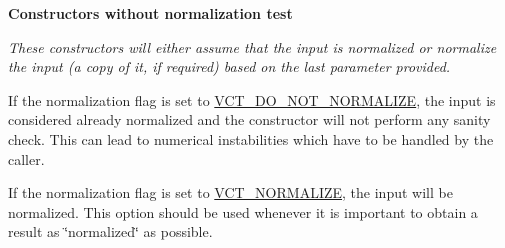 \begin{Indent}{\bf Constructors without normalization test}\par
{\em These constructors will either assume that the input is normalized or normalize the input (a copy of it, if required) based on the last parameter provided.


\begin{DoxyItemize}
\item If the normalization flag is set to \hyperlink{vct_forward_declarations_8h_a6fd516b0c35fa9967b4da5f03a788985}{V\-C\-T\-\_\-\-D\-O\-\_\-\-N\-O\-T\-\_\-\-N\-O\-R\-M\-A\-L\-I\-Z\-E}, the input is considered already normalized and the constructor will not perform any sanity check. This can lead to numerical instabilities which have to be handled by the caller.


\item If the normalization flag is set to \hyperlink{vct_forward_declarations_8h_ae54c682b919a7c5743ea498810518565}{V\-C\-T\-\_\-\-N\-O\-R\-M\-A\-L\-I\-Z\-E}, the input will be normalized. This option should be used whenever it is important to obtain a result as \char`\"{}normalized\char`\"{} as possible.



\end{DoxyItemize}}
\end{Indent}
